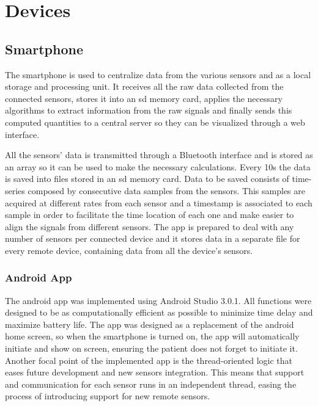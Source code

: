 
\section{Devices}



\FloatBarrier
\subsection{Smartphone}

The smartphone is used to centralize data from the various sensors and as a local storage and processing unit. It receives all the raw data collected from the connected sensors, stores it into an \ac{sd} memory card, applies the necessary algorithms to extract information from the raw signals and finally sends this computed quantities to a central server so they can be visualized through a web interface.

All the sensors' data is transmitted through a Bluetooth interface and is stored as an array so it can be used to make the necessary calculations. Every 10s the data is saved into files stored in an \ac{sd} memory card. Data to be saved consists of time-series composed by consecutive data samples from the sensors. This samples are acquired at different rates from each sensor and a timestamp is associated to each sample in order to facilitate the time location of each one and make easier to align the signals from different sensors. The app is prepared to deal with any number of sensors per connected device and it stores data in a separate file for every remote device, containing data from all the device's sensors.



\subsubsection{Android App}

The android app was implemented using Android Studio 3.0.1. All functions were designed to be as computationally efficient as possible to minimize time delay and maximize battery life. The app was designed as a replacement of the android home screen, so when the smartphone is turned on, the app will automatically initiate and show on screen, ensuring the patient does not forget to initiate it. Another focal point of the implemented app is the thread-oriented logic that eases future development and new sensors integration. This means that support and communication for each sensor runs in an independent thread, easing the process of introducing support for new remote sensors.

